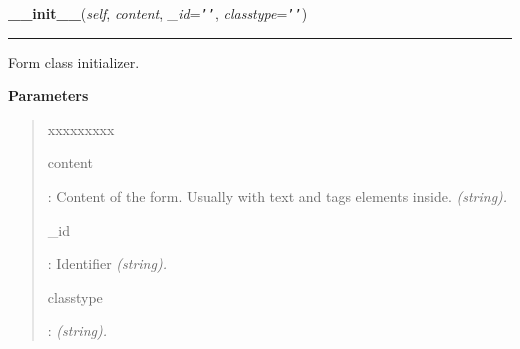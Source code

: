     \label{module_Web:DIV:__init__}

    \vspace{0.5ex}

\hspace{.8\funcindent}\begin{boxedminipage}{\funcwidth}

    \raggedright \textbf{\_\_init\_\_}(\textit{self}, \textit{content}, \textit{\_id}={\tt \texttt{'}\texttt{}\texttt{'}}, \textit{classtype}={\tt \texttt{'}\texttt{}\texttt{'}})

    \vspace{-1.5ex}

    \rule{\textwidth}{0.5\fboxrule}
\setlength{\parskip}{2ex}

Form class initializer.
%
\begin{quote}

\end{quote}
\setlength{\parskip}{1ex}
      \textbf{Parameters}
      \vspace{-1ex}

      \begin{quote}
        \begin{Ventry}{xxxxxxxxx}

          \item[content]


:    Content of the form. Usually with text and tags elements inside. \emph{(string).}
          \item[\_id]


:                Identifier \emph{(string).}
          \item[classtype]


:  \emph{(string).}
        \end{Ventry}

      \end{quote}

    \end{boxedminipage}

    \label{module_Web:DIV:write}

    \vspace{0.5ex}

